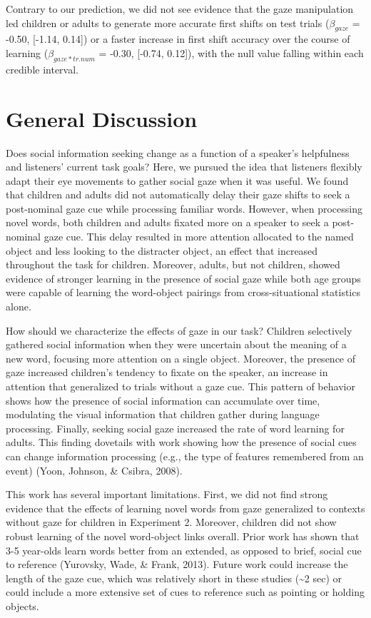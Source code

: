 \documentclass[10pt, letterpaper]{article}
\begin{document}
Contrary to our prediction, we did not see evidence that the gaze
manipulation led children or adults to generate more accurate first
shifts on test trials (\(\beta_{gaze}\) = -0.50, {[}-1.14, 0.14{]}) or a
faster increase in first shift accuracy over the course of learning
(\(\beta_{gaze*tr.num}\) = -0.30, {[}-0.74, 0.12{]}), with the null
value falling within each credible interval.

\hypertarget{general-discussion}{%
\section{General Discussion}\label{general-discussion}}

Does social information seeking change as a function of a speaker's
helpfulness and listeners' current task goals? Here, we pursued the idea
that listeners flexibly adapt their eye movements to gather social gaze
when it was useful. We found that children and adults did not
automatically delay their gaze shifts to seek a post-nominal gaze cue
while processing familiar words. However, when processing novel words,
both children and adults fixated more on a speaker to seek a
post-nominal gaze cue. This delay resulted in more attention allocated
to the named object and less looking to the distracter object, an effect
that increased throughout the task for children. Moreover, adults, but
not children, showed evidence of stronger learning in the presence of
social gaze while both age groups were capable of learning the
word-object pairings from cross-situational statistics alone.

How should we characterize the effects of gaze in our task? Children
selectively gathered social information when they were uncertain about
the meaning of a new word, focusing more attention on a single object.
Moreover, the presence of gaze increased children's tendency to fixate
on the speaker, an increase in attention that generalized to trials
without a gaze cue. This pattern of behavior shows how the presence of
social information can accumulate over time, modulating the visual
information that children gather during language processing. Finally,
seeking social gaze increased the rate of word learning for adults. This
finding dovetails with work showing how the presence of social cues can
change information processing (e.g., the type of features remembered
from an event) (Yoon, Johnson, \& Csibra, 2008).

This work has several important limitations. First, we did not find
strong evidence that the effects of learning novel words from gaze
generalized to contexts without gaze for children in Experiment 2.
Moreover, children did not show robust learning of the novel word-object
links overall. Prior work has shown that 3-5 year-olds learn words
better from an extended, as opposed to brief, social cue to reference
(Yurovsky, Wade, \& Frank, 2013). Future work could increase the length
of the gaze cue, which was relatively short in these studies
(\textasciitilde{}2 sec) or could include a more extensive set of cues
to reference such as pointing or holding objects.
\end{document}

